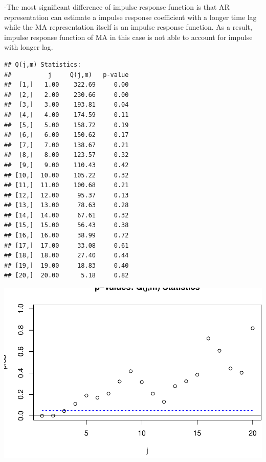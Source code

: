 \documentclass[]{article}
\begin{document}
-The most significant difference of impulse response function is that AR
representation can estimate a impulse response coefficient with a longer
time lag while the MA representation itself is an impulse response
function. As a result, impulse response function of MA in this case is
not able to account for impulse with longer lag.

\begin{verbatim}
## Q(j,m) Statistics:  
##          j     Q(j,m)   p-value
##  [1,]   1.00    322.69     0.00
##  [2,]   2.00    230.66     0.00
##  [3,]   3.00    193.81     0.04
##  [4,]   4.00    174.59     0.11
##  [5,]   5.00    158.72     0.19
##  [6,]   6.00    150.62     0.17
##  [7,]   7.00    138.67     0.21
##  [8,]   8.00    123.57     0.32
##  [9,]   9.00    110.43     0.42
## [10,]  10.00    105.22     0.32
## [11,]  11.00    100.68     0.21
## [12,]  12.00     95.37     0.13
## [13,]  13.00     78.63     0.28
## [14,]  14.00     67.61     0.32
## [15,]  15.00     56.43     0.38
## [16,]  16.00     38.99     0.72
## [17,]  17.00     33.08     0.61
## [18,]  18.00     27.40     0.44
## [19,]  19.00     18.83     0.40
## [20,]  20.00      5.18     0.82
\end{verbatim}

\includegraphics{HW3_files/figure-latex/unnamed-chunk-8-1.pdf}
\end{document}
